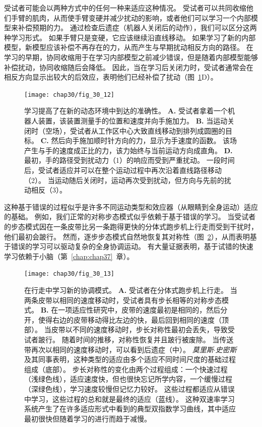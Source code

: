 受试者可能会以两种方式中的任何一种来适应这种情况。
受试者可以共同收缩他们手臂的肌肉，从而使手臂变硬并减少扰动的影响，或者他们可以学习一个内部模型来补偿预期的力。
通过检查后遗症（机器人关闭后的动作），我们可以区分这两种学习形式。
如果手臂只是变硬，它应该继续沿直线移动。
如果学习了新的内部模型，新模型应该补偿不再存在的力，从而产生与早期扰动相反方向的路径。
在学习的早期，协同收缩用于在学习内部模型之前减少错误，但是随着内部模型能够补偿扰动，协同收缩随后会降低。
因此，当在学习后关闭力时，受试者通常会在相反方向显示出较大的后效应，表明他们已经补偿了扰动（图~\ref{fig:30_12}D）。


\begin{figure}[htbp]
	\centering
	\texttt{[image: chap30/fig\_30\_12]}
	\caption{学习提高了在新的动态环境中到达的准确性\cite{brashers1996consolidation}。
		\textbf{A.} 受试者拿着一个机器人装置，该装置测量手的位置和速度并向手施加力。
		\textbf{B.} 当运动关闭时（空场），受试者从工作区中心大致直线移动到排列成圆圈的目标。
		\textbf{C.} 然后向手施加顺时针方向的力，显示为手速度的函数。
		该场产生与手的速度成正比的力，该力始终与当前运动方向成直角。
		\textbf{D.} 最初，手的路径受到扰动力（1）的响应而受到严重扰动。
		一段时间后，受试者适应并可以在整个运动过程中再次沿着直线路径移动（2）。
		当运动随后关闭时，运动再次受到扰动，但方向与先前的扰动相反（3）。}
	\label{fig:30_12}
\end{figure}


这种基于错误的过程似乎是许多不同运动类型和效应器（从眼睛到全身运动）适应的基础。
例如，我们正常的对称步态模式似乎依赖于基于错误的学习。
当受试者的步态模式因在一条皮带比另一条跑得更快的分体式跑步机上行走而受到干扰时，他们最初会跛行。
然而，逐步步态模式自然地恢复其对称性（图~\ref{fig:30_13}），从而表明基于错误的学习可以驱动复杂的全身协调运动。
有大量证据表明，基于试错的快速学习依赖于小脑（第~\ref{chap:chap37}~章）。


\begin{figure}[htbp]
	\centering
	\texttt{[image: chap30/fig\_30\_13]}
	\caption{在行走中学习新的协调模式。
		\textbf{A.} 受试者在分体式跑步机上行走。
		当两条皮带以相同的速度移动时，受试者具有步长相等的对称步态模式。
		\textbf{B.} 在一项适应性研究中，皮带的速度最初是相同的，然后分开，使得右边的皮带移动得比左边的快，最后回到相同的速度（顶部）。
		当皮带以不同的速度移动时，步长对称性最初会丢失，导致受试者跛行。
		随着时间的推移，对称性恢复并且跛行被废除。
		当传送带再次以相同的速度移动时，可以看到后遗症（中）。
		\textit{莫里斯$\cdot$史密斯}及其同事表明，这种类型的适应由多个适应不同时间尺度的基础过程组成（底部）。
		步长对称性的变化由两个过程组成：一个快速过程（浅绿色线），适应速度快，但也很快忘记所学内容，一个缓慢过程（深绿色线），学习速度较慢但记忆力较好。
		这些过程都适应从错误中学习，这些过程的总和就是最终的适应（蓝线）。
		这种双速率学习系统产生了在许多适应形式中看到的典型双指数学习曲线，其中适应最初很快但随着学习的进行而趋于减慢\cite{roemmich2016seeing}。}
	\label{fig:30_13}
\end{figure}


